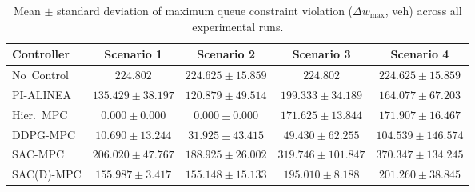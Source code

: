 \begin{table}[htbp]
\centering
\caption{Mean $\pm$ standard deviation of maximum queue constraint violation ($\Delta w_{\max}$, veh) across all experimental runs.}
\label{tab:dw_max_comparison}
\begin{tabular}{lcccc}
\toprule
Controller & Scenario 1 & Scenario 2 & Scenario 3 & Scenario 4 \\
\midrule
No~Control & $224.802$ & $224.625 \pm 15.859$ & $224.802$ & $224.625 \pm 15.859$ \\
PI-ALINEA & $135.429 \pm 38.197$ & $120.879 \pm 49.514$ & $199.333 \pm 34.189$ & $164.077 \pm 67.203$ \\
Hier.~MPC & $0.000 \pm 0.000$ & $0.000 \pm 0.000$ & $171.625 \pm 13.844$ & $171.907 \pm 16.467$ \\
DDPG-MPC & $10.690 \pm 13.244$ & $31.925 \pm 43.415$ & $49.430 \pm 62.255$ & $104.539 \pm 146.574$ \\
SAC-MPC & $206.020 \pm 47.767$ & $188.925 \pm 26.002$ & $319.746 \pm 101.847$ & $370.347 \pm 134.245$ \\
SAC(D)-MPC & $155.987 \pm 3.417$ & $155.148 \pm 15.133$ & $195.010 \pm 8.188$ & $201.260 \pm 38.845$ \\
\bottomrule
\end{tabular}
\end{table}
